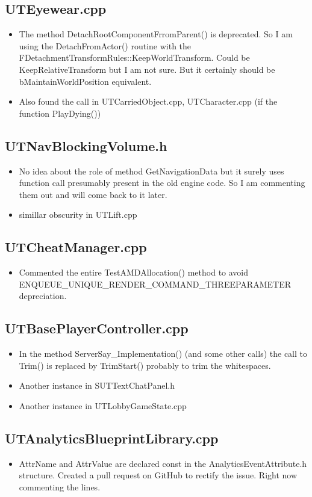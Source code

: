 \documentclass{article}
\begin{document}
\subsection{UTEyewear.cpp}
\begin{itemize}
\item The method DetachRootComponentFrromParent() is deprecated. So I am using the DetachFromActor() routine with the FDetachmentTransformRules::KeepWorldTransform.  Could be KeepRelativeTransform but I am not sure.  But it certainly should be bMaintainWorldPosition equivalent.
  \item Also found the call in {\color{filecolor}UTCarriedObject.cpp}, {\color{filecolor}UTCharacter.cpp} (if the function PlayDying())
  \end{itemize}
  \subsection{UTNavBlockingVolume.h}
  \begin{itemize}
  \item No idea about the role of method GetNavigationData but it surely uses function call presumably present in the old engine code.  So I am commenting them out and will come back to it later.
    \item simillar obscurity in UTLift.cpp
  \end{itemize}
  \subsection{UTCheatManager.cpp}
  \begin{itemize}
  \item Commented the entire TestAMDAllocation() method to avoid  ENQUEUE\_UNIQUE\_RENDER\_COMMAND\_THREEPARAMETER depreciation.
  \end{itemize}
  \subsection{UTBasePlayerController.cpp}
  \begin{itemize}
  \item In the method ServerSay\_Implementation() (and some other calls) the call to Trim() is replaced by TrimStart() probably to trim the whitespaces.
  \item Another instance in SUTTextChatPanel.h
    \item Another instance in UTLobbyGameState.cpp
  \end{itemize}
  \subsection{UTAnalyticsBlueprintLibrary.cpp}
  \begin{itemize}
  \item AttrName and AttrValue are declared const in the AnalyticsEventAttribute.h structure.  Created a pull request on GitHub to rectify the issue.  Right now commenting the lines.
  \end{itemize}
\end{document}
